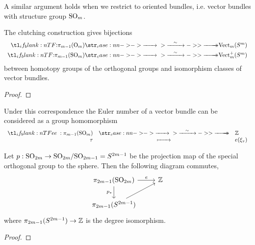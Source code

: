 
A similar argument holds when we restrict to oriented bundles, i.e. vector bundles with structure group ${\operatorname{SO}}_m$.

\begin{theorem}
	The clutching construction gives bijections
	\[
		\begin{aligned}
			\lkxfunc{}{\pi_{m-1}(\O_m)}{\op{Vect}_m(S^m)} \\
			\lkxfunc{}{\pi_{m-1}(\SO_m)}{\op{Vect}_m^+(S^m)}
		\end{aligned}
	\]
	between homotopy groups of the orthogonal groups and isomorphism classes of vector bundles.
\end{theorem}
\begin{proof}
\end{proof}

Under this correspondence the Euler number of a vector bundle can be considered as a group homomorphism
\[
	\lkxfunc{e}{\pi_{m-1}(\SO_m)}{\Z}{\tau}{e(\xi_\tau)}
\]
\begin{theorem}\label{thm:euler-number-of-vector-bundle-over-sphere}
	Let $p : {\operatorname{SO}}_{2m} \to {\operatorname{SO}}_{2m}/{\operatorname{SO}}_{2m-1}= S^{2m-1}$ be the projection map of the special orthogonal group to the sphere. Then the following diagram commutes,
\[\begin{tikzcd}
	{\pi_{2m-1}(\SO_{2m})} & \Z \\
	{\pi_{2m-1}(S^{2m-1})}
	\arrow["e", from=1-1, to=1-2]
	\arrow["{p_*}"', from=1-1, to=2-1]
	\arrow[from=2-1, to=1-2]
\end{tikzcd}\]
where $\pi_{2m-1}(S^{2m-1})\to \mathbb{Z}$ is the degree isomorphism.
\end{theorem}
\begin{proof}
\end{proof}

\begin{definition}
\end{definition}

